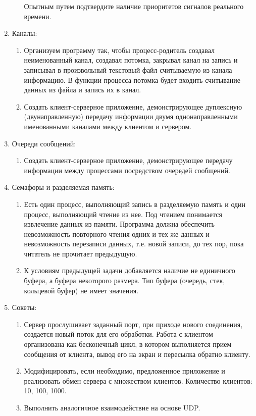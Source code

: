 \begin{enumerate}
\begin{enumerate}
			Опытным путем подтвердите наличие приоритетов сигналов реального времени.
		\end{enumerate}
	\item Каналы:
		\begin{enumerate}
			\item Организуем программу  так, чтобы процесс-родитель создавал неименованный канал, создавал потомка, закрывал канал на запись и записывал в произвольный текстовый файл считываемую из канала информацию. В функции процесса-потомка будет входить считывание данных из файла и запись их в канал.
			\item Создать клиент-серверное приложение, демонстрирующее дуплексную (двунаправленную) передачу информации двумя однонаправленными именованными каналами между клиентом и сервером.
		\end{enumerate}
	\item Очереди сообщений:
		\begin{enumerate}
			\item Создать клиент-серверное приложение, демонстрирующее передачу информации между процессами посредством очередей сообщений.
		\end{enumerate}
	\item Семафоры и разделяемая память:
		\begin{enumerate}
			\item Есть один процесс, выполняющий запись в разделяемую память и один процесс, выполняющий чтение из нее. Под чтением понимается извлечение данных из памяти. Программа должна обеспечить невозможность повторного чтения одних и тех же данных и невозможность перезаписи данных, т.е. новой записи, до тех пор, пока читатель не прочитает предыдущую.
			\item К условиям предыдущей задачи добавляется наличие не единичного буфера, а буфера некоторого размера. Тип буфера (очередь, стек, кольцевой буфер) не имеет значения.
		\end{enumerate}
	\item Сокеты:
		\begin{enumerate}
			\item Сервер прослушивает заданный порт, при приходе нового соединения, создается новый поток для его обработки. Работа с клиентом организована как бесконечный цикл, в котором выполняется прием сообщения от клиента, вывод его на экран и пересылка обратно клиенту.
			\item Модифицировать, если необходимо, предложенное приложение и реализовать обмен сервера с множеством клиентов. Количество клиентов: 10, 100, 1000.
			\item Выполнить аналогичное взаимодействие на основе UDP.
		\end{enumerate}
\end{enumerate}
